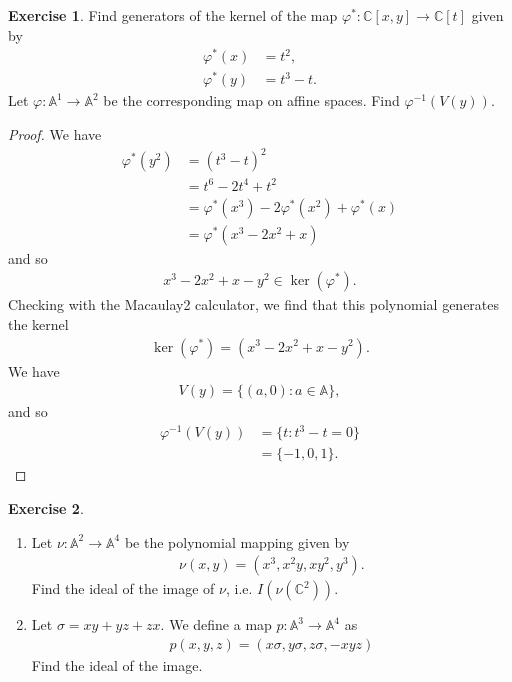 \documentclass[12pt]{extarticle}
\newcommand{\set}[1]{\{#1\}}
\newcommand{\C}{\mathbb{C}}
\newcommand{\<}{\langle}
\renewcommand{\>}{\rangle}
\theoremstyle{definition}
\newtheorem{exercise}{Exercise}
\begin{document}
\begin{exercise}
  Find generators of the kernel of the map $\varphi^*: \C[x,y] \to \C[t]$ given by
  \begin{align*}
    \varphi^*(x) &= t^2, \\
    \varphi^*(y) &= t^3-t.
  \end{align*}
  Let $\varphi: \mathbb{A}^1 \to \mathbb{A}^2$ be the corresponding map on affine spaces. Find $\varphi^{-1}(V(y))$.
\end{exercise}
\begin{proof}
  We have
  \begin{align*}
    \varphi^*(y^2) 
    &= (t^3-t)^2 \\
    &= t^6 - 2t^4 + t^2 \\
    &= \varphi^*(x^3) -  2\varphi^*(x^2) + \varphi^*(x) \\
    &= \varphi^*(x^3 - 2x^2 + x)
  \end{align*}
  and so
  \begin{align*}
    x^3 - 2x^2 + x - y^2  \in \ker(\varphi^*).
  \end{align*}
  Checking with the Macaulay2 calculator, we find that this polynomial generates the kernel
  \begin{align*}
    \ker(\varphi^*) = (x^3 - 2x^2 + x - y^2).
  \end{align*}
  We have
  \begin{align*}
    V(y) = \set{(a,0) : a \in \mathbb{A}},
  \end{align*}
  and so
  \begin{align*}
    \varphi^{-1}(V(y))
    &= \set{t : t^3-t = 0} \\
    &
    = \set{-1,0,1}.
  \end{align*}
\end{proof}
\begin{exercise}
  \begin{enumerate}
  \item
    Let $\nu: \mathbb{A}^2 \to \mathbb{A}^4$ be the polynomial mapping given by
    \begin{align*}
      \nu(x,y) = (x^3, x^2y, xy^2, y^3).
    \end{align*}
    Find the ideal of the image of $\nu$, i.e. $I(\nu(\mathbb{C}^2))$.
  \item
    Let $\sigma = xy + yz + zx.$ We define a map $p: \mathbb{A}^3 \to \mathbb{A}^4$ as
    \begin{align*}
      p(x,y,z)=(x\sigma, y\sigma, z\sigma, -xyz)
    \end{align*}
    Find the ideal of the image.
  \end{enumerate}
\end{exercise}
\end{document}
